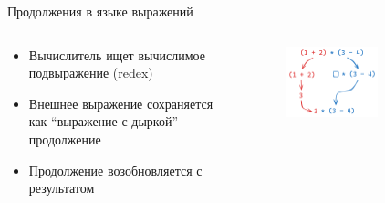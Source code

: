     \begin{frame}[fragile]{Продолжения в языке выражений}
        \vspace{-1em}
        \begin{columns}[onlytextwidth]
            \begin{column}{0.465\textwidth}
                \begin{itemize}
                    \item Вычислитель ищет вычислимое подвыражение (redex)
                    \item Внешнее выражение сохраняется как ``выражение с дыркой'' --- продолжение
                    \item Продолжение возобновляется с результатом
                \end{itemize}
            \end{column}%
            \begin{column}{0.55\textwidth}
                \begin{figure}[h]
                    \centering
                    \includegraphics[width=0.63\textwidth]{figs/cont-expr}
                \end{figure}
            \end{column}
        \end{columns}
    \end{frame}

